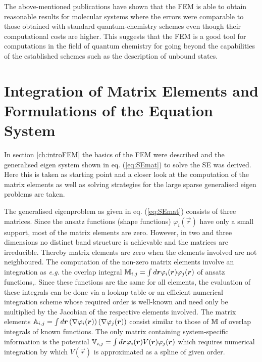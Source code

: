 The above-mentioned publications have shown that the FEM is able to obtain reasonable results for molecular systems where the errors were comparable to those obtained with standard quantum-chemistry schemes even though their computational costs are higher.
This suggests that the FEM is a good tool for computations in the field of quantum chemistry for going beyond the capabilities of the established schemes such as the description of unbound states.

\section{Integration of Matrix Elements and Formulations of the Equation System}
\label{ch:feInt}
In section \ref{ch:introFEM} the basics of the FEM were described and the generalised eigen system shown in eq. (\ref{eq:SEmat}) to solve the SE was derived.
Here this is taken as starting point and a closer look at the computation of the matrix elements as well as solving strategies for the large sparse generalised eigen problems are taken.

The generalised eigenproblem as given in eq. (\ref{eq:SEmat}) consists of three matrices.
Since the ansatz functions (shape functions) $\varphi_i(\vec{r})$ have only a small support, most of the matrix elements are zero. 
However, in two and three dimensions no distinct band structure is achievable and the matrices are irreducible.
Thereby matrix elements are zero when the elements involved are not neighboured.
The computation of the non-zero matrix elements involve an integration as \textit{e.g.} the overlap integral $\mathbb{M}_{i,j}=\int d \bm{r} \varphi_i(\bm{r}) \varphi_j(\bm{r})$ of ansatz functions,.
Since these functions are the same for all elements, the evaluation of these integrals can be done via a lookup-table or an efficient numerical integration scheme whose required order is well-known and need only be multiplied by the Jacobian of the respective elements involved.
The matrix elements $\mathbb{A}_{i,j}=\int d \bm{r} \left(\nabla \varphi_i(\bm{r})\right)\left(\nabla \varphi_j(\bm{r})\right)$ consist similar to those of $\mathbb{M}$ of overlap integrals of known functions.
The only matrix containing system-specific information is the potential $\mathbb{V}_{i,j}=\int d \bm{r} \varphi_i(\bm{r}) V(\bm{r}) \varphi_j(\bm{r})$ which requires numerical integration by which $V(\vec{r})$ is approximated as a spline of given order.


